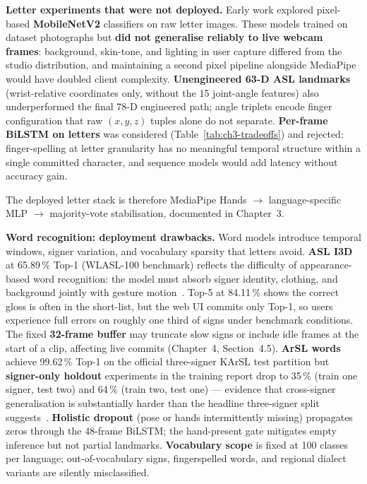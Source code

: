 \noindent\textbf{Letter experiments that were not deployed.} Early work explored pixel-based \textbf{MobileNetV2} classifiers on raw letter images. These models trained on dataset photographs but \textbf{did not generalise reliably to live webcam frames}: background, skin-tone, and lighting in user capture differed from the studio distribution, and maintaining a second pixel pipeline alongside MediaPipe would have doubled client complexity. \textbf{Unengineered 63-D ASL landmarks} (wrist-relative coordinates only, without the 15 joint-angle features) also underperformed the final 78-D engineered path; angle triplets encode finger configuration that raw $(x,y,z)$ tuples alone do not separate. \textbf{Per-frame BiLSTM on letters} was considered (Table~\ref{tab:ch3-tradeoffs}) and rejected: finger-spelling at letter granularity has no meaningful temporal structure within a single committed character, and sequence models would add latency without accuracy gain.\par\vspace{0.2cm}

\noindent The deployed letter stack is therefore MediaPipe Hands $\rightarrow$ language-specific MLP $\rightarrow$ majority-vote stabilisation, documented in Chapter~3.\par\vspace{0.2cm}



\noindent\textbf{Word recognition: deployment drawbacks.} Word models introduce temporal windows, signer variation, and vocabulary sparsity that letters avoid. \textbf{ASL I3D} at 65.89\,\% Top-1 (WLASL-100 benchmark) reflects the difficulty of appearance-based word recognition: the model must absorb signer identity, clothing, and background jointly with gesture motion~\cite{li2020wlasl}. Top-5 at 84.11\,\% shows the correct gloss is often in the short-list, but the web UI commits only Top-1, so users experience full errors on roughly one third of signs under benchmark conditions. The fixed \textbf{32-frame buffer} may truncate slow signs or include idle frames at the start of a clip, affecting live commits (Chapter~4, Section~4.5). \textbf{ArSL words} achieve 99.62\,\% Top-1 on the official three-signer KArSL test partition but \textbf{signer-only holdout} experiments in the training report drop to 35\,\% (train one signer, test two) and 64\,\% (train two, test one) --- evidence that cross-signer generalisation is substantially harder than the headline three-signer split suggests~\cite{johnson2019signer,sidig2021karsl}. \textbf{Holistic dropout} (pose or hands intermittently missing) propagates zeros through the 48-frame BiLSTM; the hand-present gate mitigates empty inference but not partial landmarks. \textbf{Vocabulary scope} is fixed at 100 classes per language; out-of-vocabulary signs, fingerspelled words, and regional dialect variants are silently misclassified.\par\vspace{0.2cm}

